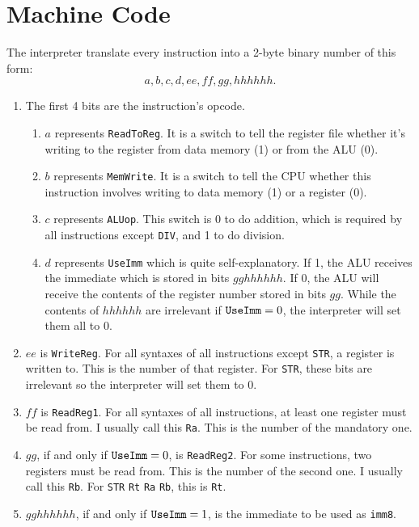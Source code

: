 \documentclass[12pt, oneside]{memoir}
\newcommand{\R}[1]{{\color{register}\texttt{R#1}}}
\newcommand{\imm}{{\color{imm}\texttt{imm8}}}
\newcommand{\instruction}[1]{{\color{instruction}\texttt{#1}}}
\begin{document}
\section{Machine Code}
The interpreter translate every instruction into a 2-byte binary number of this form:
\begin{equation*}
    a,b,c,d,ee,ff,gg,hhhhhh.
\end{equation*}
\begin{enumerate}
    \item The first 4 bits are the instruction's opcode.
    \begin{enumerate}
    \item$a$ represents \texttt{ReadToReg}. It is a switch to tell the register file whether it's writing to the register from data memory (1) or from the ALU (0).
    \item $b$ represents \texttt{MemWrite}. It is a switch to tell the CPU whether this instruction involves writing to data memory (1) or a register (0).
    \item $c$ represents \texttt{ALUop}. This switch is 0 to do addition, which is required by all instructions except \instruction{DIV}, and 1 to do division.
    \item $d$ represents \texttt{UseImm} which is quite self-explanatory. If 1, the ALU receives the immediate which is stored in bits $gghhhhhh$. 
    If 0, the ALU will receive the contents of the register number stored in bits $gg$. While the contents of $hhhhhh$ are irrelevant if $\text{\texttt{UseImm}} = 0$, the interpreter will set them all to 0.
    \end{enumerate}
    \item $ee$ is \texttt{WriteReg}. For all syntaxes of all instructions except \instruction{STR}, a register is written to. This is the number of that register. For \instruction{STR}, these bits are irrelevant so the interpreter will set them to 0.
    \item $ff$ is \texttt{ReadReg1}. For all syntaxes of all instructions, at least one register must be read from. I usually call this \R{a}. This is the number of the mandatory one.
    \item $gg$, if and only if $\text{\texttt{UseImm}} = 0$, is \texttt{ReadReg2}. For some instructions, two registers must be read from. This is the number of the second one. I usually call this \R{b}. For \instruction{STR} \R{t} \R{a} \R{b}, this is \R{t}.
    \item $gghhhhhh$, if and only if $\text{\texttt{UseImm}} = 1$, is the immediate to be used as \imm.
\end{enumerate}
\end{document}
